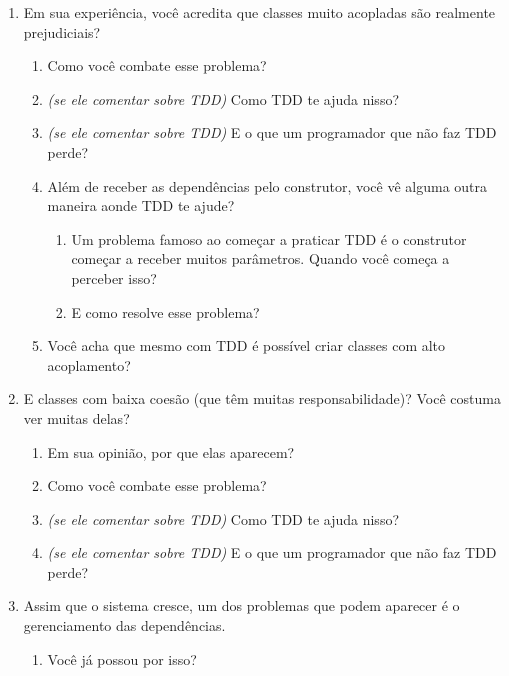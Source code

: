 \begin{enumerate}
	\item{Em sua experiência, você acredita que classes muito acopladas são realmente prejudiciais?}
		\begin{enumerate}
			\item Como você combate esse problema?

			\item \textit{(se ele comentar sobre TDD)} Como TDD te ajuda nisso?

			\item \textit{(se ele comentar sobre TDD)} E o que um programador que não faz
			TDD perde?
			
			\item Além de receber as dependências pelo construtor, você vê alguma outra
			maneira aonde TDD te ajude?
				\begin{enumerate}
					\item Um problema famoso ao começar a praticar TDD é o construtor começar a
					receber muitos parâmetros. Quando você começa a perceber isso?
					\item E como resolve esse problema?
				\end{enumerate}

			\item Você acha que mesmo com TDD é possível criar classes com alto acoplamento? 
		\end{enumerate}

	\item{E classes com baixa coesão (que têm muitas responsabilidade)? Você
	costuma ver muitas delas?}
		\begin{enumerate}
			\item Em sua opinião, por que elas aparecem?

			\item Como você combate esse problema?

			\item \textit{(se ele comentar sobre TDD)} Como TDD te ajuda nisso?
			
			\item \textit{(se ele comentar sobre TDD)} E o que um programador que não faz TDD
			perde?
		\end{enumerate}

	\item Assim que o sistema cresce, um dos problemas que podem aparecer é o
	gerenciamento das dependências.
		
		\begin{enumerate}
		  \item Você já possou por isso?


\end{enumerate}
\end{enumerate}
